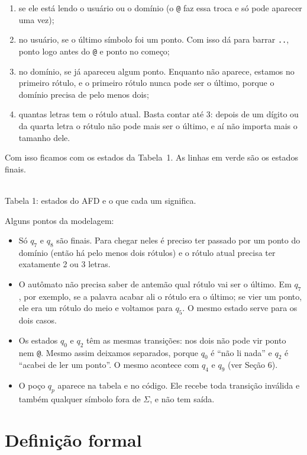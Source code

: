\documentclass[11pt,a4paper]{article}
\newcommand{\s}[1]{\texttt{#1}}
\newcommand{\q}[1]{$q_{#1}$}
\begin{document}
\begin{enumerate}
  \item se ele está lendo o usuário ou o domínio (o \s{@} faz essa troca e só pode aparecer uma vez);
  \item no usuário, se o último símbolo foi um ponto. Com isso dá para barrar \s{..}, ponto logo antes do
        \s{@} e ponto no começo;
  \item no domínio, se já apareceu algum ponto. Enquanto não aparece, estamos no primeiro rótulo, e o
        primeiro rótulo nunca pode ser o último, porque o domínio precisa de pelo menos dois;
  \item quantas letras tem o rótulo atual. Basta contar até 3: depois de um dígito ou da quarta letra o
        rótulo não pode mais ser o último, e aí não importa mais o tamanho dele.
\end{enumerate}

Com isso ficamos com os estados da Tabela~1. As linhas em verde são os estados finais.

\begin{table}[htbp]
\centering\small\TabelaEstados\\[3pt]
{\small Tabela 1: estados do AFD e o que cada um significa.}
\end{table}

Alguns pontos da modelagem:
\begin{itemize}
  \item Só \q7 e \q8 são finais. Para chegar neles é preciso ter passado por um ponto do domínio (então
        há pelo menos dois rótulos) e o rótulo atual precisa ter exatamente 2 ou 3 letras.
  \item O autômato não precisa saber de antemão qual rótulo vai ser o último. Em \q7, por exemplo, se a
        palavra acabar ali o rótulo era o último; se vier um ponto, ele era um rótulo do meio e voltamos
        para \q5. O mesmo estado serve para os dois casos.
  \item Os estados \q0 e \q2 têm as mesmas transições: nos dois não pode vir ponto nem \s{@}. Mesmo assim
        deixamos separados, porque \q0 é ``não li nada'' e \q2 é ``acabei de ler um ponto''. O mesmo acontece
        com \q4 e \q9 (ver Seção 6).
  \item O poço $q_p$ aparece na tabela e no código. Ele recebe toda transição inválida e também qualquer
        símbolo fora de $\Sigma$, e não tem saída.
\end{itemize}

\section{Definição formal}
\end{document}
